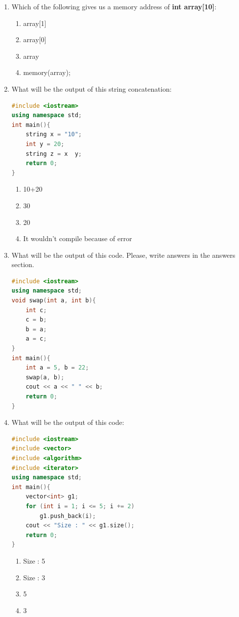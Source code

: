 \documentclass[10pt]{article}
\begin{document}
\begin{enumerate}
\item Which of the following gives us a memory address of \textbf{int array[10]}:
\begin{multicols}{4}
\begin{enumerate}
    \item array[1]
    \item array[0]
    \item array 
    \item memory(array);
\end{enumerate}
\end{multicols}



\item What will be the output of this string concatenation:
\begin{lstlisting}[language=C++]
#include <iostream>
using namespace std;
int main(){
   	string x = "10";
    int y = 20;
    string z = x  y;
    return 0;
}
\end{lstlisting}
\begin{multicols}{4}
\begin{enumerate}
    \item 10+20
    \item 30
    \item 20 
    \item It wouldn’t compile because of error 
\end{enumerate}
\end{multicols}





\item What will be the output of this code. Please, write answers in the answers section.
\begin{lstlisting}[language=C++]
#include <iostream>
using namespace std;
void swap(int a, int b){
    int c;
    c = b;
    b = a;
    a = c;
}
int main(){
    int a = 5, b = 22;
    swap(a, b);
    cout << a << " " << b;
    return 0;
}
\end{lstlisting}




\item What will be the output of this code:
\begin{lstlisting}[language=C++]
#include <iostream>
#include <vector>
#include <algorithm>
#include <iterator>
using namespace std;
int main(){
    vector<int> g1; 
    for (int i = 1; i <= 5; i += 2) 
        g1.push_back(i); 
    cout << "Size : " << g1.size(); 
    return 0;
}
\end{lstlisting}
\begin{multicols}{4}
\begin{enumerate}
    \item Size : 5
    \item Size : 3
    \item 5
    \item 3 
\end{enumerate}
\end{multicols}







\end{enumerate}
\end{document}
